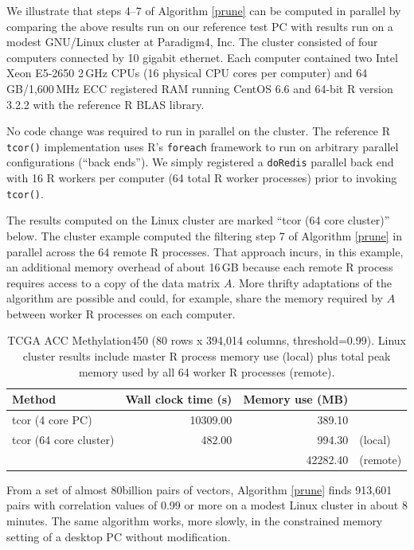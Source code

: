 \documentclass{article}
\let\proglang=\textsf
\numberwithin{algorithmctr}{section}
\begin{document}
We illustrate that steps 4--7 of Algorithm \ref{prune} can be computed in
parallel by comparing the above results run on our reference test PC with
results run on a modest GNU/Linux cluster at Paradigm4, Inc. The cluster
consisted of four computers connected by 10 gigabit ethernet. Each computer
contained two Intel Xeon E5-2650 2$\,$GHz CPUs (16 physical CPU cores per
computer) and 64$\,$GB/1,600$\,$MHz ECC registered RAM running CentOS 6.6 and
64-bit \proglang{R} version 3.2.2 with the reference \proglang{R} BLAS library.

No code change was required to run in parallel on the cluster. The reference \proglang{R}
{\tt tcor()} implementation uses \proglang{R}'s {\tt foreach} \cite{foreach} framework to
run on arbitrary parallel configurations (``back ends''). We simply registered
a {\tt doRedis} \cite{doredis} parallel back end with 16 \proglang{R} workers per computer
(64 total \proglang{R} worker processes) prior to invoking {\tt tcor()}.

The results computed on the Linux cluster are marked ``tcor (64 core cluster)''
below. The cluster example computed the filtering step 7 of Algorithm
\ref{prune} in parallel across the 64 remote \proglang{R} processes. That approach incurs,
in this example, an additional memory overhead of about 16$\,$GB because each
remote \proglang{R} process requires access to a copy of the data matrix $A$. More thrifty
adaptations of the algorithm are possible and could, for example, share the
memory required by $A$ between worker \proglang{R} processes on each computer.

\begin{table}[ht]
\centering
{\small
\begin{tabular}{lrrl}
  \hline
Method & Wall clock time (s) & Memory use (MB) &   \\ 
  \hline
tcor (4 core PC) & 10309.00 & 389.10 &  \\ 
  tcor (64 core cluster) & 482.00 & 994.30 & (local) \\ 
   &  & 42282.40 & (remote) \\ 
   \hline
\end{tabular}
}
\caption{TCGA ACC Methylation450 (80 rows x 394,014 columns, threshold=0.99). Linux cluster results include master R process memory use (local) plus total peak memory used by all 64 worker R processes (remote).} 
\label{TCGA3}
\end{table}From a set of almost 80billion pairs of vectors, Algorithm \ref{prune} finds 913,601
pairs with correlation values of 0.99 or more on a modest Linux
cluster in about 8 minutes. The same algorithm works, more slowly, in
the constrained memory setting of a desktop PC without modification.
\end{document}
